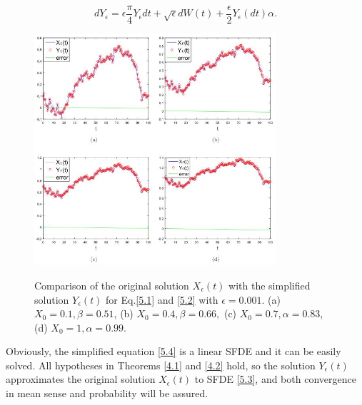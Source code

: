 \documentclass[a4 paper, 12pt]{report}
\theoremstyle{plain}
\begin{document}
\begin{equation}\label{5.4}
dY_\epsilon = \epsilon\frac{\pi}{4}Y_\epsilon dt+\sqrt{\epsilon}dW(t)+\frac{\epsilon}{2}Y_\epsilon(dt){\alpha}.
\end{equation}
\newpage 
\begin{figure}[hp]
	\centering
		\includegraphics[width=0.80\textwidth]{figure1.JPG}
	\label{figure1}
	\caption{Comparison of the original solution $X_\epsilon(t)$ with the simplified solution $Y_\epsilon(t)$ for Eq.\eqref{5.1}
and \eqref{5.2} with $\epsilon = 0.001$. (a) $X_0 = 0.1, \beta = 0.51$, (b) $X_0 = 0.4, \beta = 0.66,$ (c) $X_0 = 0.7, \alpha = 0.83$,
(d) $X_0 = 1, \alpha = 0.99.$}
\end{figure}

Obviously, the simplified equation \eqref{5.4} is a linear SFDE and it can be easily
solved. All hypotheses in Theorems \ref{4.1} and \ref{4.2} hold, so the solution $Y_\epsilon(t)$ approximates the original solution $X_\epsilon(t)$ to SFDE \eqref{5.3}, and both convergence in
mean sense and probability will be assured.\\
\end{document}
